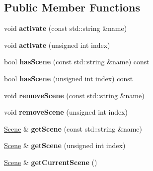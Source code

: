 \subsection*{Public Member Functions}
\begin{DoxyCompactItemize}
\item 
\mbox{\label{classbkengine_1_1Game_a4c31e4b00495c28530575b845d2c6384}} 
void {\bfseries activate} (const std\+::string \&name)
\item 
\mbox{\label{classbkengine_1_1Game_a1916cb138d297d1a8e5c1c2b31843309}} 
void {\bfseries activate} (unsigned int index)
\item 
\mbox{\label{classbkengine_1_1Game_acba38c7030021f866cff9a1df67ee00d}} 
bool {\bfseries has\+Scene} (const std\+::string \&name) const
\item 
\mbox{\label{classbkengine_1_1Game_a74e4a0a4ec36b5282e5f0cddfa786f99}} 
bool {\bfseries has\+Scene} (unsigned int index) const
\item 
\mbox{\label{classbkengine_1_1Game_a32a365e70c7e4afeb43359a8e66b5d08}} 
void {\bfseries remove\+Scene} (const std\+::string \&name)
\item 
\mbox{\label{classbkengine_1_1Game_afe4b932a5b3d331ea48f63cb9b48e6aa}} 
void {\bfseries remove\+Scene} (unsigned int index)
\item 
\mbox{\label{classbkengine_1_1Game_a486a485a7ce8122dff0d63f439081ec0}} 
\hyperlink{classbkengine_1_1Scene}{Scene} \& {\bfseries get\+Scene} (const std\+::string \&name)
\item 
\mbox{\label{classbkengine_1_1Game_a8b9e4c8580e8b183138e37617efa4db4}} 
\hyperlink{classbkengine_1_1Scene}{Scene} \& {\bfseries get\+Scene} (unsigned int index)
\item 
\mbox{\label{classbkengine_1_1Game_ad9d677a0c5648f37961af294d12ef407}} 
\hyperlink{classbkengine_1_1Scene}{Scene} \& {\bfseries get\+Current\+Scene} ()
\item 

\end{DoxyCompactItemize}
